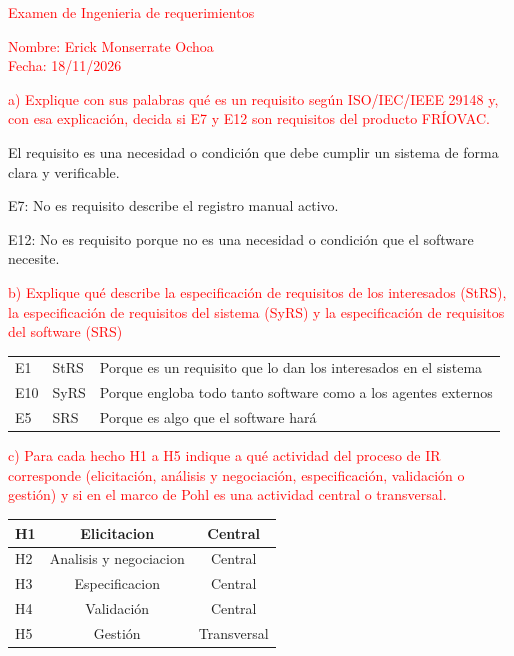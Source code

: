 \documentclass[11pt,a4paper]{article}
\newcommand{\enun}[1]{\textcolor{red}{#1}}
\begin{document}
\noindent{}

\bigskip


\begin{center}
\enun{\large Examen de Ingenieria de requerimientos}
\end{center}

\enun{Nombre: Erick Monserrate Ochoa}\\
\enun{Fecha: 18/11/2026}

\enun{a) Explique con sus palabras qué es un requisito según ISO/IEC/IEEE 29148 y, con esa
explicación, decida si E7 y E12 son requisitos del producto FRÍOVAC.}

El requisito es una necesidad o condición que debe cumplir un sistema de forma clara y
verificable.

E7: No es requisito describe el registro manual activo.

E12: No es requisito porque no es una necesidad o condición que el software necesite.

\enun{b) Explique qué describe la especificación de requisitos de los interesados (StRS), la
especificación de requisitos del sistema (SyRS) y la especificación de requisitos del
software (SRS)}

\begin{center}
\begin{tabularx}{\linewidth}{l l X}
E1  & StRS & Porque es un requisito que lo dan los interesados en el sistema \\
E10 & SyRS & Porque engloba todo tanto software como a los agentes externos \\
E5  & SRS  & Porque es algo que el software hará \\
\end{tabularx}
\end{center}


\enun{c) Para cada hecho H1 a H5 indique a qué actividad del proceso de IR corresponde
(elicitación, análisis y negociación, especificación, validación o gestión) y si en el
marco de Pohl es una actividad central o transversal.}

\begin{center}
\begin{tabularx}{\linewidth}{|l|C|C|}
\hline
H1 & Elicitacion            & Central \\ \hline
H2 & Analisis y negociacion & Central \\ \hline
H3 & Especificacion         & Central \\ \hline
H4 & Validación             & Central \\ \hline
H5 & Gestión                & Transversal \\ \hline
\end{tabularx}
\end{center}
\end{document}
